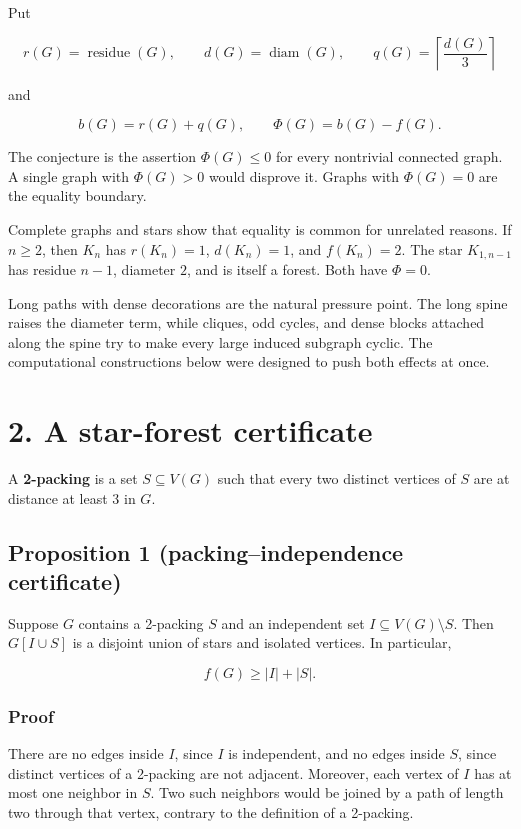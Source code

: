 \documentclass[
  11pt,
  letterpaper,
]{article}
\begin{document}
Put

\[
r(G)=\operatorname{residue}(G),\qquad
d(G)=\operatorname{diam}(G),\qquad
q(G)=\left\lceil\frac{d(G)}3\right\rceil
\]

and

\[
b(G)=r(G)+q(G),\qquad
\Phi(G)=b(G)-f(G).
\]

The conjecture is the assertion \(\Phi(G)\le0\) for every nontrivial
connected graph. A single graph with \(\Phi(G)>0\) would disprove it.
Graphs with \(\Phi(G)=0\) are the equality boundary.

Complete graphs and stars show that equality is common for unrelated
reasons. If \(n\ge2\), then \(K_n\) has \(r(K_n)=1\), \(d(K_n)=1\), and
\(f(K_n)=2\). The star \(K_{1,n-1}\) has residue \(n-1\), diameter
\(2\), and is itself a forest. Both have \(\Phi=0\).

Long paths with dense decorations are the natural pressure point. The
long spine raises the diameter term, while cliques, odd cycles, and
dense blocks attached along the spine try to make every large induced
subgraph cyclic. The computational constructions below were designed to
push both effects at once.

\section{2. A star-forest certificate}\label{a-star-forest-certificate}

A \textbf{2-packing} is a set \(S\subseteq V(G)\) such that every two
distinct vertices of \(S\) are at distance at least \(3\) in \(G\).

\subsection{Proposition 1 (packing--independence
certificate)}\label{proposition-1-packingindependence-certificate}

Suppose \(G\) contains a 2-packing \(S\) and an independent set
\(I\subseteq V(G)\setminus S\). Then \(G[I\cup S]\) is a disjoint union
of stars and isolated vertices. In particular,

\[
f(G)\ge |I|+|S|.
\]

\subsubsection{Proof}\label{proof}

There are no edges inside \(I\), since \(I\) is independent, and no
edges inside \(S\), since distinct vertices of a 2-packing are not
adjacent. Moreover, each vertex of \(I\) has at most one neighbor in
\(S\). Two such neighbors would be joined by a path of length two
through that vertex, contrary to the definition of a 2-packing.
\end{document}
